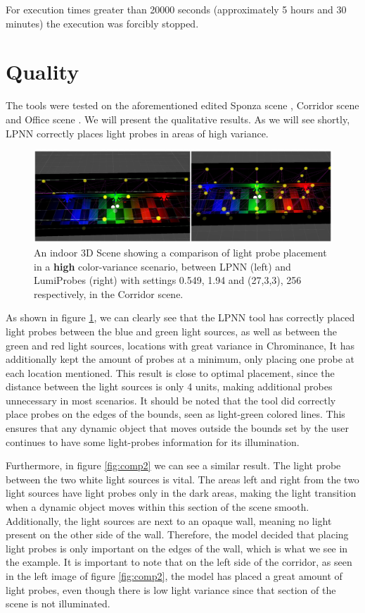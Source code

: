 For execution times greater than 20000 seconds (approximately 5 hours and 30 minutes) the execution was forcibly stopped. 

\section{Quality}
\label{sec:4_quality}
The tools were tested on the aforementioned edited Sponza scene \parencite{Sponza2017}, Corridor scene \parencite{Corridor2021} and Office scene \parencite{Office2021}. We will present the qualitative results. As we will see shortly, LPNN correctly places light probes in areas of high variance.

\begin{figure}[h]
	\centering
	\includegraphics[scale=0.18]{Graphics/results/concats/comparison1.png}
	\caption{An indoor 3D Scene showing a comparison of light probe placement in a \textbf{high} color-variance scenario, between LPNN (left) and LumiProbes (right) with settings 0.549, 1.94 and (27,3,3), 256 respectively, in the Corridor scene.}
	\label{fig:comp1}
\end{figure}

As shown in figure \ref{fig:comp1}, we can clearly see that the LPNN tool has correctly placed light probes between the blue and green light sources, as well as between the green and red light sources, locations with great variance in Chrominance, It has additionally kept the amount of probes at a minimum, only placing one probe at each location mentioned. This result is close to optimal placement, since the distance between the light sources is only 4 units, making additional probes unnecessary in most scenarios. It should be noted that the tool did correctly place probes on the edges of the bounds, seen as light-green colored lines. This ensures that any dynamic object that moves outside the bounds set by the user continues to have some light-probes information for its illumination. 

Furthermore, in figure \ref{fig:comp2} we can see a similar result. The light probe between the two white light sources is vital. The areas left and right from the two light sources have light probes only in the dark areas, making the light transition when a dynamic object moves within this section of the scene smooth. Additionally, the light sources are next to an opaque wall, meaning no light present on the other side of the wall. Therefore, the model decided that placing light probes is only important on the edges of the wall, which is what we see in the example. It is important to note that on the left side of the corridor, as seen in the left image of figure \ref{fig:comp2}, the model has placed a great amount of light probes, even though there is low light variance since that section of the scene is not illuminated. 

